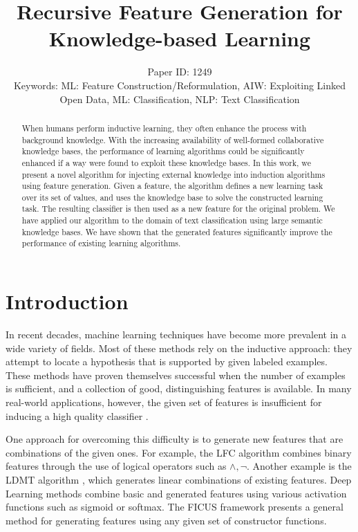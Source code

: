 \documentclass[letterpaper]{article} %
\title{Recursive Feature Generation for Knowledge-based Learning}
\author{Paper ID: 1249 \\
	Keywords: ML: Feature Construction/Reformulation, AIW: Exploiting Linked Open Data, ML: Classification, NLP: Text Classification
}
\theoremstyle{definition}
\begin{document}
\maketitle
\begin{abstract}
	When humans perform inductive learning, they often enhance the process with background
	knowledge. With the increasing availability of well-formed collaborative knowledge bases, the
	performance of learning algorithms could be significantly enhanced if a way were found to exploit
	these knowledge bases. In this work, we present a novel algorithm for injecting external knowledge
	into induction algorithms using feature generation. Given a feature, the algorithm defines a new
	learning task over its set of values, and uses the knowledge base to solve the constructed learning
	task. The resulting classifier is then used as a new feature for the original problem. We have
	applied our algorithm to the domain of text classification using large semantic knowledge bases. We
	have shown that the generated features significantly improve the performance of existing learning
	algorithms.
\end{abstract}

\section{Introduction}
\label{sec:Intro}
In recent decades, machine learning techniques have become more prevalent in a wide variety of fields. %
Most of these methods rely on the inductive approach: they attempt to locate a hypothesis that is  supported by given labeled examples. These methods have proven themselves successful when the number of examples is sufficient, and a collection of good,
distinguishing features is available.
In many real-world applications, however, the given set of features is insufficient for inducing a high quality classifier \cite{levi2004learning,paulheim2012unsupervisedfull}.

One approach for overcoming this difficulty is to generate new features that are combinations of the given ones.
For example, the LFC algorithm \cite{ragavan1993complex} combines binary features through the use of logical operators such as $\land ,\lnot$.
Another example is the LDMT algorithm \cite{utgo1991linear}, which generates linear combinations of existing features.
Deep Learning methods combine basic and generated features using various activation functions such as sigmoid or softmax.
The FICUS framework \cite{markovitch2002feature} presents a general method for generating features using any given set of constructor functions.
\end{document}
